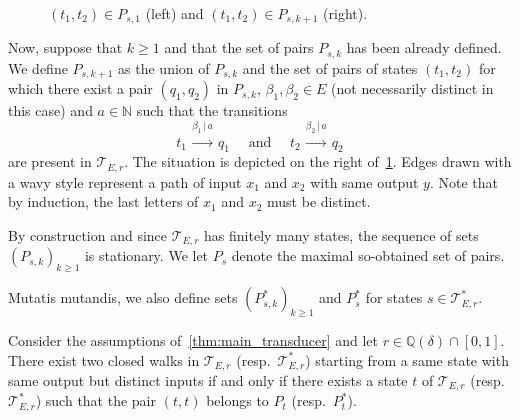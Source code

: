 \documentclass[12pt,reqno]{amsart}
\begin{document}
\begin{definition}
\begin{figure}[ht]
\caption{$(t_1,t_2)\in P_{s,1}$ (left) and $(t_1,t_2)\in P_{s,k+1}$ (right).}
\label{fig:sit1}
\end{figure} 

Now, suppose that $k\ge 1$ and that the set of pairs $P_{s,k}$ has been already defined. We define $P_{s,k+1}$ as the union of $P_{s,k}$ and the set of pairs of states $(t_1,t_2)$ for which there exist a pair $(q_1,q_2)$ in $P_{s,k}$,  $\beta_1,\beta_2\in E$ (not necessarily distinct in this case) and $a\in\mathbb{N}$ such that 
the transitions
\[
    t_1\stackrel{\beta_1 \,|\, a}{\xrightarrow{\hspace{1cm}}} q_1  
    \quad \text{ and }\quad
    t_2\stackrel{\beta_2 \,|\, a}{\xrightarrow{\hspace{1cm}}} q_2 
\]
are present in $\mathcal{T}_{E,r}$.
The situation is depicted on the right of~\cref{fig:sit1}. Edges drawn with a wavy style represent a path of input $x_1$ and $x_2$ with same output $y$. Note that by induction, the last letters of $x_1$ and $x_2$ must be distinct. 

By construction and since $\mathcal{T}_{E,r}$ has finitely many states, the sequence of sets $(P_{s,k})_{k\ge 1}$ is stationary. We let $P_s$ denote the maximal so-obtained set of pairs.

Mutatis mutandis, we also define sets $(P^*_{s,k})_{k\ge 1}$ and $P^*_s$ for states $s\in \mathcal{T}^*_{E,r}$.
\end{definition}    

\begin{proposition}
\label{prop:2-walks-characterization}
Consider the assumptions of~\cref{thm:main_transducer} and let $r\in\mathbb{Q}(\delta)\cap[0,1]$. There exist two closed walks in $\mathcal{T}_{E,r}$ (resp.\ $\mathcal{T}_{E,r}^*$) starting from a same state with same output but distinct inputs if and only if there exists a state $t$ of $\mathcal{T}_{E,r}$ (resp.\ $\mathcal{T}_{E,r}^*$) such that the pair $(t,t)$ belongs to $P_t$ (resp.\ $P^*_t$).
\end{proposition}
\end{document}
